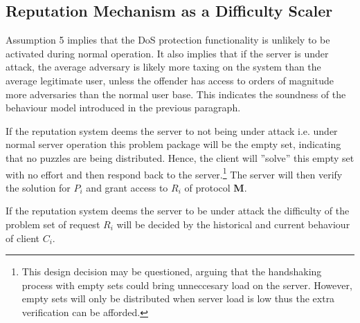 \subsection{Reputation Mechanism as a Difficulty Scaler}\label{text:diffscaler}
Assumption 5 implies that the DoS protection functionality is unlikely to be activated during normal operation. It also implies that if the server is under attack, the average adversary is likely more taxing on the system than the average legitimate user, unless the offender has access to orders of magnitude more adversaries than the normal user base. This indicates the soundness of the behaviour model introduced in the previous paragraph.





If the reputation system deems the server to not being under attack i.e. under normal server operation this problem package will be the empty set, indicating that no puzzles are being distributed.
Hence, the client will ''solve'' this empty set with no effort and then respond back to the server.\footnote{This design decision may be questioned, arguing that the handshaking process with empty sets could bring unneccesary load on the server.
However, empty sets will only be distributed when server load is low thus the extra verification can be afforded.}
The server will then verify the solution for $P_i$ and grant access to $R_i$ of protocol \textbf{M}.

If the reputation system deems the server to be under attack the difficulty of the problem set of request $R_i$ will be decided by the historical and current behaviour of client $C_i$. 

